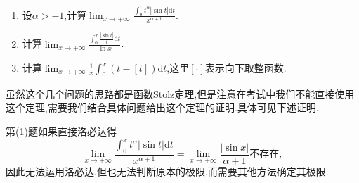 \documentclass[../../main.tex]{subfiles}
\begin{document}
\begin{example}\label{example:4.272123}
\begin{enumerate}[(1)]
\item 设\(\alpha > - 1\),计算\(\lim_{x\rightarrow +\infty}\frac{\int_{0}^{x}t^{\alpha}|\sin t|\mathrm{d}t}{x^{\alpha + 1}}\).

\item 计算\(\lim_{x\rightarrow +\infty}\frac{\int_{0}^{x}\frac{|\sin t|}{t}\mathrm{d}t}{\ln x}\).

\item  计算\(\lim_{x\rightarrow +\infty}\frac{1}{x}\int_{0}^{x}(t - [t])\mathrm{d}t\),这里\([\cdot]\)表示向下取整函数.
\end{enumerate}
\end{example}
\begin{note}
虽然这个几个问题的思路都是\hyperref[theorem:函数Stolz定理]{函数Stolz定理},但是注意在考试中我们不能直接使用这个定理,需要我们结合具体问题给出这个定理的证明.具体可见下述证明.
\end{note}
\begin{remark}
第(1)题如果直接洛必达得
\[
\lim_{x\rightarrow +\infty}\frac{\int_{0}^{x}t^{\alpha}|\sin t|\mathrm{d}t}{x^{\alpha + 1}}=\lim_{x\rightarrow +\infty}\frac{|\sin x|}{\alpha + 1}\text{不存在},
\]
因此无法运用洛必达,但也无法判断原本的极限,而需要其他方法确定其极限.
\end{remark}
\end{document}
